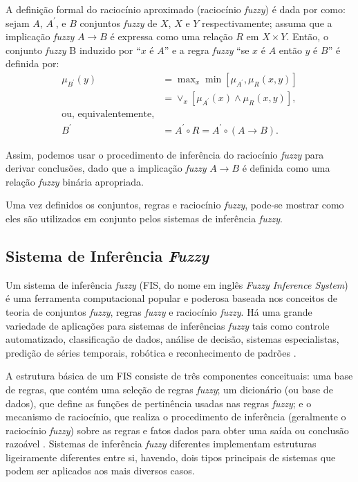 A definição formal do raciocínio aproximado (raciocínio \textit{fuzzy}) é dada por  como: sejam $A$, $A^\prime$, e $B$ conjuntos \textit{fuzzy} de $X$, $X$ e $Y$ respectivamente; assuma que a implicação \textit{fuzzy} $A \rightarrow B$ é expressa como uma relação $R$ em $X \times Y$. Então, o conjunto \textit{fuzzy} B induzido por ``$x$ é $A$'' e a regra \textit{fuzzy} ``se $x$ é $A$ então $y$ é $B$'' é definida por:
\begin{align*}
\mu_{B^\prime}(y) &= \max\nolimits_x \min[\mu_{A^\prime}, \mu_R(x,y)]
\\
&= \vee_x[\mu_{A^\prime}(x) \wedge \mu_R(x,y)], \\
\mbox{ou, equivalentemente,} \\
B^\prime &= A^\prime \circ R = A^\prime \circ (A \rightarrow B).
\end{align*}
 
Assim, podemos usar o procedimento de inferência do raciocínio \textit{fuzzy} para derivar conclusões, dado que a implicação \textit{fuzzy} $A \rightarrow B$ é definida como uma relação \textit{fuzzy} binária apropriada.

Uma vez definidos os conjuntos, regras e raciocínio \textit{fuzzy}, pode-se mostrar como eles são utilizados em conjunto pelos sistemas de inferência \textit{fuzzy}.
 
\subsection{Sistema de Inferência \textit{Fuzzy}}
\label{sec:sistema_inferencai_fuzzy}

Um sistema de inferência \textit{fuzzy} (FIS, do nome em inglês \textit{Fuzzy Inference System}) é uma ferramenta computacional popular e poderosa baseada nos conceitos de teoria de conjuntos \textit{fuzzy}, regras \textit{fuzzy} e raciocínio \textit{fuzzy}. Há uma grande variedade de aplicações para sistemas de inferências \textit{fuzzy} tais como controle automatizado, classificação de dados, análise de decisão, sistemas especialistas, predição de séries temporais, robótica e reconhecimento de padrões \cite[p.~73]{Jang1997}.

A estrutura básica de um FIS consiste de três componentes conceituais: uma base de regras, que contém uma seleção de regras \textit{fuzzy}; um dicionário (ou base de dados), que define as funções de pertinência usadas nas regras \textit{fuzzy}; e o mecanismo de raciocínio, que realiza o procedimento de inferência (geralmente o raciocínio \textit{fuzzy}) sobre as regras e fatos dados para obter uma saída ou conclusão razoável \cite[p.~73]{Jang1997}. Sistemas de inferência \textit{fuzzy} diferentes implementam estruturas ligeiramente diferentes entre si, havendo, dois tipos principais de sistemas que podem ser aplicados aos mais diversos casos.

